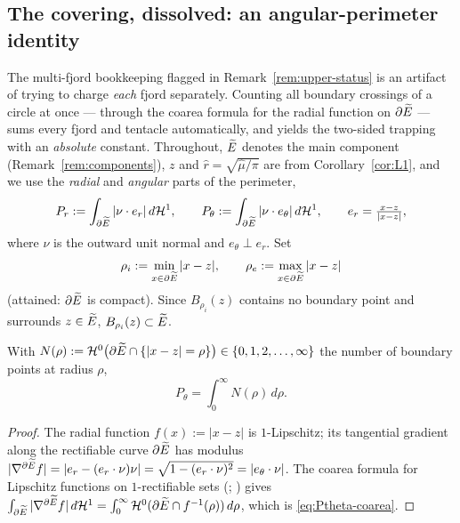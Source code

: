 \subsection{The covering, dissolved: an angular-perimeter identity}
\label{ss:covering}

The multi-fjord bookkeeping flagged in Remark~\ref{rem:upper-status} is an
artifact of trying to charge \emph{each} fjord separately. Counting all
boundary crossings of a circle at once --- through the coarea formula for
the radial function on $\partial\widetilde E$ --- sums every fjord and tentacle
automatically, and yields the two-sided trapping with an \emph{absolute}
constant. Throughout, $\widetilde E$ denotes the main component
(Remark~\ref{rem:components}), $z$ and $\hat r=\sqrt{\hat\mu/\pi}$ are from
Corollary~\ref{cor:L1}, and we use the \emph{radial} and \emph{angular}
parts of the perimeter,
\[
   P_r:=\int_{\partial\widetilde E}|\nu\cdot e_r|\,d\mathcal{H}^1,
   \qquad
   P_\theta:=\int_{\partial\widetilde E}|\nu\cdot e_\theta|\,d\mathcal{H}^1,
   \qquad e_r=\tfrac{x-z}{|x-z|},
\]
where $\nu$ is the outward unit normal and $e_\theta\perp e_r$. Set
\[
   \rho_i:=\min_{x\in\partial\widetilde E}|x-z|,\qquad
   \rho_e:=\max_{x\in\partial\widetilde E}|x-z|
\]
(attained: $\partial\widetilde E$ is compact). Since $B_{\rho_i}(z)$ contains no
boundary point and surrounds $z\in\widetilde E$, $B_{\rho_i}(z)\subset\widetilde E$.

\begin{lemma}\label{lem:Ptheta}
With $N(\rho):=\mathcal{H}^0\bigl(\partial\widetilde E\cap\{|x-z|=\rho\}\bigr)\in\{0,1,
2,\dots,\infty\}$ the number of boundary points at radius $\rho$,
\begin{equation}\label{eq:Ptheta-coarea}
   P_\theta=\int_0^\infty N(\rho)\,d\rho .
\end{equation}
\end{lemma}

\begin{proof}
The radial function $f(x):=|x-z|$ is $1$-Lipschitz; its tangential gradient
along the rectifiable curve $\partial\widetilde E$ has modulus $|\nabla^{\partial
\widetilde E}f|=|e_r-(e_r\cdot\nu)\nu|=\sqrt{1-(e_r\cdot\nu)^2}=|e_\theta\cdot\nu|$.
The coarea formula for Lipschitz functions on $1$-rectifiable sets
\textup{(}\cite[Theorem~2.93]{AFP2000}; \cite[\S3.4.2,
Theorem~3.13]{EvansGariepy2015}\textup{)} gives
$\int_{\partial\widetilde E}|\nabla^{\partial\widetilde E}f|\,d\mathcal{H}^1
=\int_0^\infty\mathcal{H}^0(\partial\widetilde E\cap f^{-1}(\rho))\,d\rho$, which is
\eqref{eq:Ptheta-coarea}.
\end{proof}

